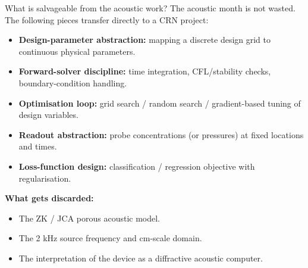 \documentclass[aspectratio=169,11pt]{beamer}
\begin{document}
\begin{frame}{What is salvageable from the acoustic work?}
  \small
  The acoustic month is not wasted. The following pieces transfer directly to a CRN project:
  \begin{itemize}
    \item \textbf{Design-parameter abstraction:} mapping a discrete design grid to continuous physical parameters.
    \item \textbf{Forward-solver discipline:} time integration, CFL/stability checks, boundary-condition handling.
    \item \textbf{Optimisation loop:} grid search / random search / gradient-based tuning of design variables.
    \item \textbf{Readout abstraction:} probe concentrations (or pressures) at fixed locations and times.
    \item \textbf{Loss-function design:} classification / regression objective with regularisation.
  \end{itemize}

  \vspace{0.15cm}
  \textbf{What gets discarded:}
  \begin{itemize}
    \item The ZK / JCA porous acoustic model.
    \item The 2 kHz source frequency and cm-scale domain.
    \item The interpretation of the device as a diffractive acoustic computer.
  \end{itemize}
\end{frame}
\end{document}
